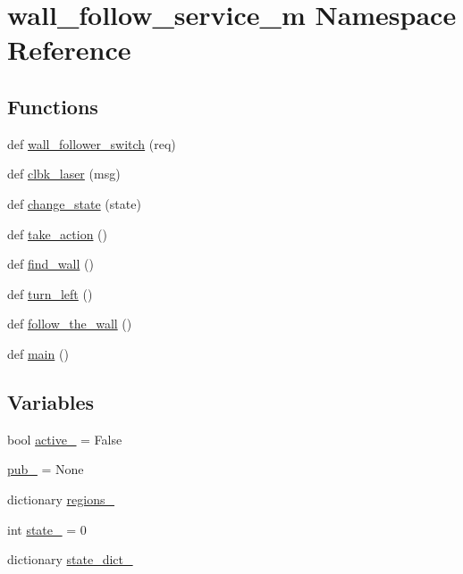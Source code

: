 \hypertarget{namespacewall__follow__service__m}{}\section{wall\+\_\+follow\+\_\+service\+\_\+m Namespace Reference}
\label{namespacewall__follow__service__m}
\subsection*{Functions}
\begin{DoxyCompactItemize}
\item 
def \hyperlink{namespacewall__follow__service__m_a8367ccc5f1456166406c0d577d019baf}{wall\+\_\+follower\+\_\+switch} (req)
\item 
def \hyperlink{namespacewall__follow__service__m_ab07be9226f1ee837e03f25d282336b09}{clbk\+\_\+laser} (msg)
\item 
def \hyperlink{namespacewall__follow__service__m_ad99900df1d3fa5dd0683d507b2253b17}{change\+\_\+state} (state)
\item 
def \hyperlink{namespacewall__follow__service__m_a027e1db38933af0544136a5c84de5a83}{take\+\_\+action} ()
\item 
def \hyperlink{namespacewall__follow__service__m_ae65476bf2d8bd9007fda22eaea1ed2b1}{find\+\_\+wall} ()
\item 
def \hyperlink{namespacewall__follow__service__m_aa4262b4e6e90a36c0226c9b90ee97d14}{turn\+\_\+left} ()
\item 
def \hyperlink{namespacewall__follow__service__m_a2f9f1202ed1e75ee80471a9dff56fdbe}{follow\+\_\+the\+\_\+wall} ()
\item 
def \hyperlink{namespacewall__follow__service__m_ab4dbc79e32b45a381737fb7b3c126edf}{main} ()
\end{DoxyCompactItemize}
\subsection*{Variables}
\begin{DoxyCompactItemize}
\item 
bool \hyperlink{namespacewall__follow__service__m_ae80ea3e1537280d2311f2fc113a60bc7}{active\+\_\+} = False
\item 
\hyperlink{namespacewall__follow__service__m_aa66ff19a5a11afad8ec15143f733bea2}{pub\+\_\+} = None
\item 
dictionary \hyperlink{namespacewall__follow__service__m_a30a3b79a68496f06646ee64d67423f36}{regions\+\_\+}
\item 
int \hyperlink{namespacewall__follow__service__m_a1f1e8197a7b86b64c5c2c256173e371d}{state\+\_\+} = 0
\item 
dictionary \hyperlink{namespacewall__follow__service__m_a723d03e512b26cc484d9299418b2773d}{state\+\_\+dict\+\_\+}
\end{DoxyCompactItemize}


